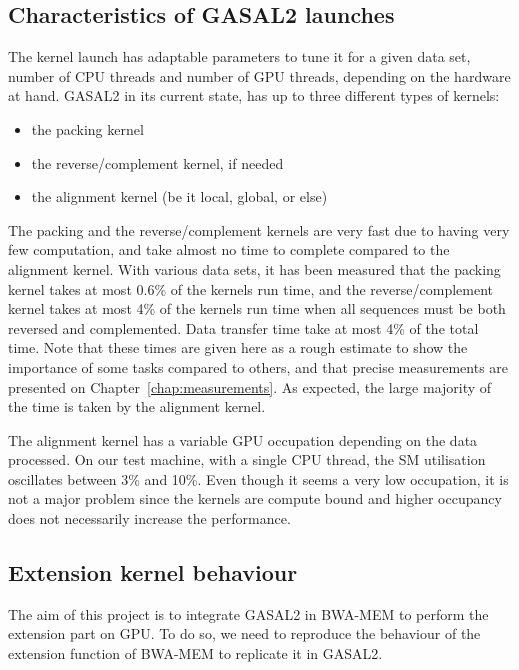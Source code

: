\subsection{Characteristics of GASAL2 launches}

The kernel launch has adaptable parameters to tune it for a given data set, number of CPU threads and number of GPU threads, depending on the hardware at hand. GASAL2 in its current state, has up to three different types of kernels:

\begin{itemize}
	\item the packing kernel
	\item the reverse/complement kernel, if needed
	\item the alignment kernel (be it local, global, or else)
\end{itemize}

The packing and the reverse/complement kernels are very fast due to having very few computation, and take almost no time to complete compared to the alignment kernel. With various data sets, it has been measured that the packing kernel takes at most 0.6\% of the kernels run time, and the reverse/complement kernel takes at most 4\% of the kernels run time when all sequences must be both reversed and complemented. Data transfer time take at most 4\% of the total time. Note that these times are given here as a rough estimate to show the importance of some tasks compared to others, and that precise measurements are presented on Chapter~\ref{chap:measurements}. As expected, the large majority of the time is taken by the alignment kernel.

The alignment kernel has a variable GPU occupation depending on the data processed. On our test machine, with a single CPU thread, the SM utilisation oscillates between 3\% and 10\%. Even though it seems a very low occupation, it is not a major problem since the kernels are compute bound and higher occupancy does not necessarily increase the performance.


\subsection{Extension kernel behaviour}
\label{sec:seedonly}
The aim of this project is to integrate GASAL2 in BWA-MEM to perform the extension part on GPU. To do so, we need to reproduce the behaviour of the extension function of BWA-MEM to replicate it in GASAL2.

